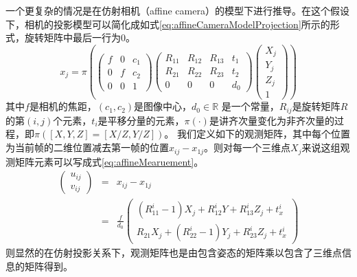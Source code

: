一个更复杂的情况是在仿射相机（affine camera）的模型下进行推导\cite{Feng2013Joint}。在这个假设下，相机的投影模型可以简化成如式\eqref{eq:affineCameraModelProjection}所示的形式，旋转矩阵中最后一行为0。
\begin{equation}\label{eq:affineCameraModelProjection}
x_j=\pi
(
\begin{pmatrix}
f & 0 & c_1\\
0 & f& c_2\\
0 & 0 &1
\end{pmatrix}
\begin{pmatrix}
R_{11} & R_{12} & R_{13} & t_1\\
R_{21} & R_{22} & R_{23} & t_2\\
0      & 0      & 0      & d_0
\end{pmatrix}
\begin{pmatrix}
X_j\\Y_j\\Z_j\\1
\end{pmatrix}
)
\end{equation}
其中$f$是相机的焦距，$(c_1,c_2)$是图像中心，$d_0\in \mathbb{R}$ 是一个常量，$R_{ij}$是旋转矩阵$R$的第$(i,j)$个元素，$t_i$是平移分量的元素，$\pi(\cdot)$是讲齐次量变化为非齐次量的过程，即$\pi([X,Y,Z]=[X/Z,Y/Z])$。
我们定义如下的观测矩阵，其中每个位置为当前帧的二维位置减去第一帧的位置$x_{ij}-x_{1j}$。则对每一个三维点$X_j$来说这组观测矩阵元素可以写成式\eqref{eq:affineMearuement}。
\begin{eqnarray}\label{eq:affineMearuement}
\begin{pmatrix}
u_{ij}\\
v_{ij}
\end{pmatrix}
&=&
x_{ij}-x_{1j}\\
&=&\frac{f}{d_0}
\begin{pmatrix}
(R_{11}^i-1)X_{j}+R_{12}^i Y +R_{13}^i Z_j+t_x^i\\
R_{21}X_j + (R_{22}^i-1)Y_j+R_{23}^i Z_j+t_x^i
\end{pmatrix}
\end{eqnarray}
则显然的在仿射投影关系下，观测矩阵也是由包含姿态的矩阵乘以包含了三维点信息的矩阵得到。

